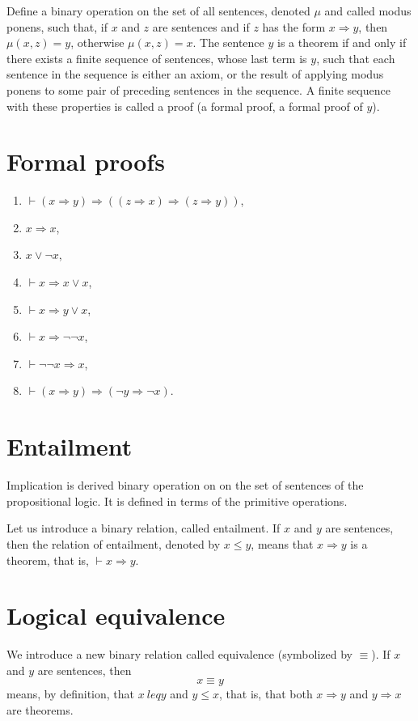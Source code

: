 \documentclass[letterpaper, 10pt]{article}
\renewcommand{\implies}{\Rightarrow}
\newcommand{\entails}{\vdash}
\begin{document}
Define a binary operation on the set of all sentences, denoted $\mu$ and called
modus ponens, such that, if $x$ and $z$ are sentences and if $z$ has the form $x
\implies y$, then $\mu(x,z) = y$, otherwise $\mu(x,z) = x$.
The sentence $y$ is a theorem if and only if there exists a finite sequence of
sentences, whose last term is $y$, such that each sentence in the sequence is
either an axiom, or the result of applying modus ponens to some pair of
preceding sentences in the sequence. A finite sequence with these properties is
called a proof (a formal proof, a formal proof of $y$).

\section{Formal proofs}

\begin{enumerate}[label=T\arabic*, left=0pt, resume]
	\item $\entails (x \implies y) \implies ((z \implies x) \implies (z \implies
		y))$,
	\item $x \implies x$,
	\item $x \lor \neg x$,
	\item $\entails x \implies x \lor x$,
	\item $\entails x \implies y \lor x$, 
	\item $\entails x \implies \neg \neg x$, 
	\item $\entails \neg \neg x \implies x$, 
	\item $\entails (x \implies y) \implies (\neg y \implies \neg x)$.
\end{enumerate}
\section{Entailment}

Implication is derived binary operation on on the set of sentences of the
propositional logic. It is defined in terms of the primitive operations.

Let us introduce a binary relation, called entailment. If $x$ and $y$ are
sentences, then the relation of entailment, denoted by $x \leq y$, means that $x
\implies y$ is a theorem, that is, $\entails x \implies y$.

\section{Logical equivalence}

We introduce a new binary relation called equivalence (symbolized by $\equiv$).
If $x$ and $y$ are sentences, then
\begin{equation*}
	x \equiv y
\end{equation*}
means, by definition, that $x\ leq y$ and $y \leq x$, that is, that both $x
\implies y$ and $y \implies x$ are theorems.
\end{document}

